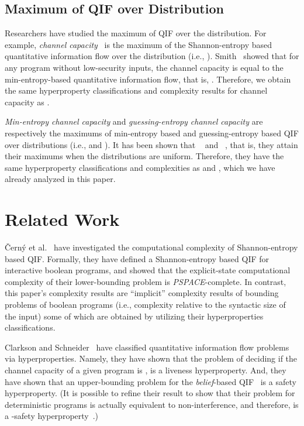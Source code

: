 \documentclass[]{eptcs}
\begin{document}
\subsection{Maximum of QIF over Distribution}

\label{sec:maxqif}

Researchers have studied the maximum of QIF over the distribution.
For example, {\em channel
  capacity}~\cite{mccamant:pldi2008,malacaria08,NMS2009} is the
maximum of the Shannon-entropy based quantitative information flow
over the distribution (i.e., ).
Smith~\cite{smith09} showed that for any program without low-security
inputs, the channel capacity is equal to the min-entropy-based
quantitative information flow, that is, .  Therefore, we obtain the same hyperproperty
classifications and complexity results for channel capacity as .

{\it Min-entropy channel capacity} and {\it guessing-entropy channel
  capacity} are respectively the maximums of min-entropy based and
guessing-entropy based QIF over distributions (i.e.,  and ).  It has been shown that
~\cite{DBLP:journals/entcs/BraunCP09,DBLP:conf/csfw/KopfS10}
and ~\cite{yasuoka:jocssubmit},
that is, they attain their maximums when the distributions are
uniform.  Therefore, they have the same hyperproperty classifications
and complexities as  and , which we have
already analyzed in this paper.


\section{Related Work}
{\v C}ern\'y et al.~\cite{DBLP:conf/csfw/CernyCH11} have investigated
the computational complexity of Shannon-entropy based QIF.  Formally,
they have defined a Shannon-entropy based QIF for interactive boolean
programs, and showed that the explicit-state computational complexity
of their lower-bounding problem is {\it PSPACE}-complete.  In
contrast, this paper's complexity results are ``implicit'' complexity
results of bounding problems of boolean programs (i.e., complexity
relative to the syntactic size of the input) some of which are
obtained by utilizing their hyperproperties classifications.

Clarkson and Schneider~\cite{DBLP:journals/jcs/ClarksonS10} have
classified quantitative information flow problems via hyperproperties.
Namely, they have shown that the problem of deciding if the channel
capacity of a given program is , is a liveness hyperproperty.  And,
they have shown that an upper-bounding problem for the {\em
  belief}-based QIF~\cite{clarkson:csf2005} is a safety hyperproperty.
(It is possible to refine their result to show that their problem for
deterministic programs is actually equivalent to non-interference, and
therefore, is a -safety hyperproperty~\cite{yasuoka:jocssubmit}.)
\end{document}
